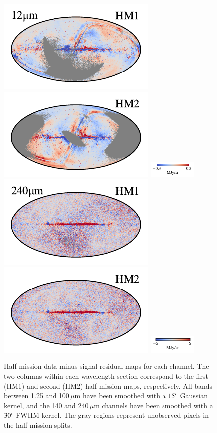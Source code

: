 \documentclass[twocolumn]{aa}
\begin{document}
\begin{figure}[t]
    \includegraphics[width=0.22\linewidth]{figs/compare_zodi_res/cosmoglobe_res_05a.pdf}%
    \includegraphics[width=0.22\linewidth]{figs/compare_zodi_res/cosmoglobe_res_05b.pdf}%
    \includegraphics[width=23mm,angle=90]{figs/compare_zodi_res/cbar_05.pdf}\hspace*{3mm}
    \includegraphics[width=0.22\linewidth]{figs/compare_zodi_res/cosmoglobe_res_10a.pdf}%
    \includegraphics[width=0.22\linewidth]{figs/compare_zodi_res/cosmoglobe_res_10b.pdf}%
    \includegraphics[width=23mm,angle=90]{figs/compare_zodi_res/cbar_10.pdf}%
    \caption{Half-mission data-minus-signal residual maps for each
      channel. The two columns within each wavelength section
      correspond to the first (HM1) and second (HM2) half-mission
      maps, respectively. All bands between 1.25 and 100$\,\mu$m have
      been smoothed with a $15\arcm$ Gaussian kernel, and the 140 and
      240\,$\mu$m channels have been smoothed with a $30\arcm$ FWHM
      kernel. The gray regions represent unobserved pixels in the
      half-mission splits.}
    \label{fig:half-mission-res2}
\end{figure}
\end{document}
